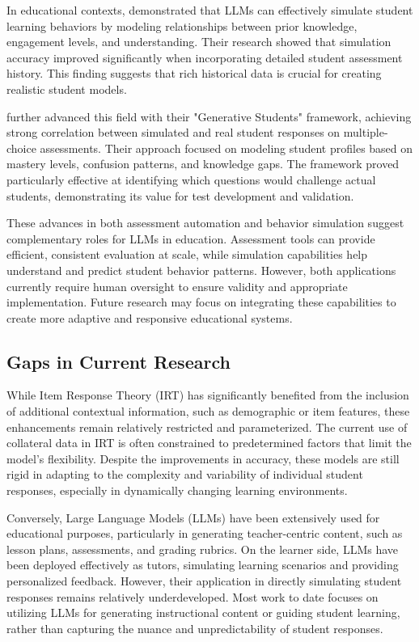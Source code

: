 \documentclass[
    a4paper, %
    10pt, %
    twoside, %
]{LTJournalArticle}
\begin{document}
In educational contexts, \textcite{xu2023leveraging} demonstrated that LLMs can effectively simulate student learning behaviors by modeling relationships between prior knowledge, engagement levels, and understanding. Their research showed that simulation accuracy improved significantly when incorporating detailed student assessment history. This finding suggests that rich historical data is crucial for creating realistic student models.

\textcite{lu2024generative} further advanced this field with their "Generative Students" framework, achieving strong correlation between simulated and real student responses on multiple-choice assessments. Their approach focused on modeling student profiles based on mastery levels, confusion patterns, and knowledge gaps. The framework proved particularly effective at identifying which questions would challenge actual students, demonstrating its value for test development and validation.

These advances in both assessment automation and behavior simulation suggest complementary roles for LLMs in education. Assessment tools can provide efficient, consistent evaluation at scale, while simulation capabilities help understand and predict student behavior patterns. However, both applications currently require human oversight to ensure validity and appropriate implementation. Future research may focus on integrating these capabilities to create more adaptive and responsive educational systems.

\subsection{Gaps in Current Research}

While Item Response Theory (IRT) has significantly benefited from the inclusion of additional contextual information, such as demographic or item features, these enhancements remain relatively restricted and parameterized. The current use of collateral data in IRT is often constrained to predetermined factors that limit the model's flexibility. Despite the improvements in accuracy, these models are still rigid in adapting to the complexity and variability of individual student responses, especially in dynamically changing learning environments.

Conversely, Large Language Models (LLMs) have been extensively used for educational purposes, particularly in generating teacher-centric content, such as lesson plans, assessments, and grading rubrics. On the learner side, LLMs have been deployed effectively as tutors, simulating learning scenarios and providing personalized feedback. However, their application in directly simulating student responses remains relatively underdeveloped. Most work to date focuses on utilizing LLMs for generating instructional content or guiding student learning, rather than capturing the nuance and unpredictability of student responses.
\end{document}
